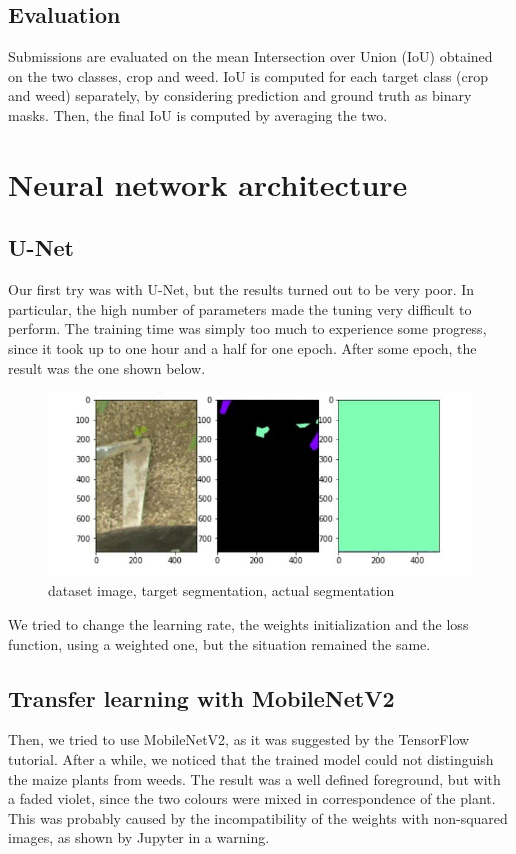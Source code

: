 \documentclass[12pt,a4paper]{report}
\begin{document}
	\section{Evaluation}
Submissions are evaluated on the mean Intersection over Union (IoU) obtained on the two classes, crop and weed. IoU is computed for each target class (crop and weed) separately, by considering prediction and ground truth as binary masks. Then, the final IoU is computed by averaging the two.


	\chapter{Neural network architecture}		
		\section{U-Net}
Our first try was with U-Net, but the results turned out to be very poor. In particular, the high number of parameters made the tuning very difficult to perform. The training time was simply too much to experience some progress, since it took up to one hour and a half for one epoch. After some epoch, the result was the one shown below. 
\begin{figure}[H]
	\includegraphics[scale = .75, center]{U_Net}
	\caption{dataset image, target segmentation, actual segmentation}
\end{figure}
	
We tried to change the learning rate, the weights initialization and the loss function, using a weighted one, but the situation remained the same.	
		
		\section{Transfer learning with MobileNetV2}
Then, we tried to use MobileNetV2, as it was suggested by the TensorFlow tutorial. After a while, we noticed that the trained model could not distinguish the maize plants from weeds. The result was a well defined foreground, but with a faded violet, since the two colours were mixed in correspondence of the plant.  This was probably caused by the incompatibility of the weights with non-squared images, as shown by Jupyter in a warning. 
	
\end{document}

